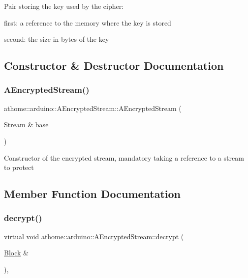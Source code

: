 Pair storing the key used by the cipher\+:


\begin{DoxyItemize}
\item first\+: a reference to the memory where the key is stored
\item second\+: the size in bytes of the key 
\end{DoxyItemize}

\subsection{Constructor \& Destructor Documentation}
\mbox{\label{classathome_1_1arduino_1_1_a_encrypted_stream_a39ed0c93b084f19762c7576434402f99}} 
\subsubsection{\texorpdfstring{A\+Encrypted\+Stream()}{AEncryptedStream()}}
{\footnotesize\ttfamily athome\+::arduino\+::\+A\+Encrypted\+Stream\+::\+A\+Encrypted\+Stream (\begin{DoxyParamCaption}\item[{Stream \&}]{base }\end{DoxyParamCaption})}

Constructor of the encrypted stream, mandatory taking a reference to a stream to protect 

\subsection{Member Function Documentation}
\mbox{\label{classathome_1_1arduino_1_1_a_encrypted_stream_a256c8946f3907cea6cd2dc73e971acd2}} 
\subsubsection{\texorpdfstring{decrypt()}{decrypt()}}
{\footnotesize\ttfamily virtual void athome\+::arduino\+::\+A\+Encrypted\+Stream\+::decrypt (\begin{DoxyParamCaption}\item[{\mbox{\hyperlink{structathome_1_1arduino_1_1_a_encrypted_stream_1_1_block}{Block}} \&}]{ }\end{DoxyParamCaption})\hspace{0.3cm}{\ttfamily [protected]}, {}}

